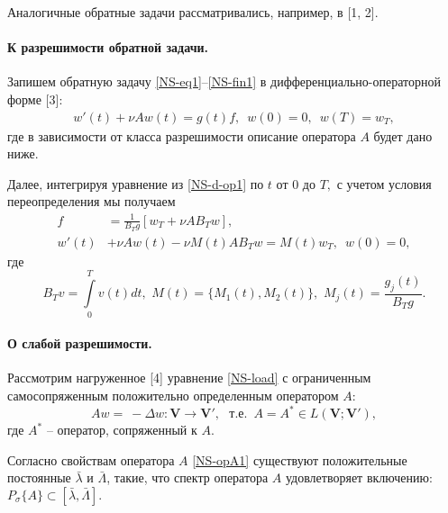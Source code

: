 Аналогичные обратные задачи рассматривались, например, в [1, 2].

\paragraph{К разрешимости обратной задачи.}
Запишем обратную задачу \eqref{NS-eq1}--\eqref{NS-fin1} в дифференциально-операторной форме [3]:
\begin{align} \label{NS-d-op1}
w'(t)+\nu Aw(t)=g(t)f,\,\,\, w(0)=0,\,\,\, w(T)=w_T,
\end{align}
где в зависимости от класса разрешимости описание оператора $A$ будет дано ниже.

Далее, интегрируя уравнение из \eqref{NS-d-op1} по $t$ от $0$ до $T,$ с учетом условия переопределения мы получаем
\begin{align} \label{NS-unk1}
f&=\frac{1}{B_Tg}\left[w_{T}+\nu A B_Tw\right],\\
\label{NS-load}w'(t)&+\nu A w(t)-\nu M(t)A B_Tw
=M(t)w_{T},\,\,\, w(0)=0,
\end{align}
где
\begin{equation}\label{NS-def1}
B_Tv=\int\limits_0^Tv(t)dt,\,\, M(t)=\{M_1(t), M_2(t)\},\,\, M_j\left(t\right)=\frac{g_j\left(t\right)}{B_Tg}.
\end{equation}

\paragraph{О слабой разрешимости.}
Рассмотрим нагруженное [4] уравнение \eqref{NS-load} с ограниченным самосопряженным положительно определенным оператором $A$:
\begin{equation} \label{NS-opA1}
Aw=\ - \Delta w: \mathbf{V}\to\mathbf{V}',\,\, \textrm{ т.е. }\, A=A^*\in L(\mathbf{V};\mathbf{V}'),
\end{equation}
где $A^*$ -- оператор, сопряженный к $A.$

Согласно свойствам оператора $A$ \eqref{NS-opA1} существуют положительные постоянные $\bar{\lambda}$ и $\bar{\Lambda}$, такие, что спектр оператора $A$ удовлетворяет включению: $P_\sigma\{A\}\subset[\bar{\lambda},\bar{\Lambda}].$

